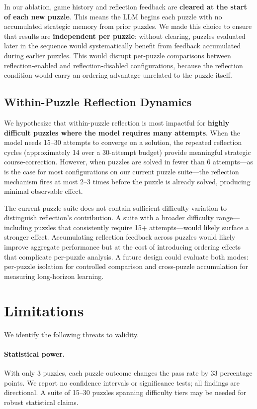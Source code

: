 \documentclass[11pt]{article}
\begin{document}
In our ablation, game history and reflection feedback are \textbf{cleared at the start of each new puzzle}.
This means the LLM begins each puzzle with no accumulated strategic memory from prior puzzles.
We made this choice to ensure that results are \textbf{independent per puzzle}: without clearing, puzzles evaluated later in the sequence would systematically benefit from feedback accumulated during earlier puzzles.
This would disrupt per-puzzle comparisons between reflection-enabled and reflection-disabled configurations, because the reflection condition would carry an ordering advantage unrelated to the puzzle itself.

\subsection{Within-Puzzle Reflection Dynamics}

We hypothesize that within-puzzle reflection is most impactful for \textbf{highly difficult puzzles where the model requires many attempts}.
When the model needs 15--30 attempts to converge on a solution, the repeated reflection cycles (approximately 14 over a 30-attempt budget) provide meaningful strategic course-correction.
However, when puzzles are solved in fewer than 6 attempts---as is the case for most configurations on our current puzzle suite---the reflection mechanism fires at most 2--3 times before the puzzle is already solved, producing minimal observable effect.

The current puzzle suite does not contain sufficient difficulty variation to distinguish reflection's contribution.
A suite with a broader difficulty range---including puzzles that consistently require 15+ attempts---would likely surface a stronger effect.
Accumulating reflection feedback across puzzles would likely improve aggregate performance but at the cost of introducing ordering effects that complicate per-puzzle analysis.
A future design could evaluate both modes: per-puzzle isolation for controlled comparison and cross-puzzle accumulation for measuring long-horizon learning.

\section{Limitations}\label{sec:limitations}

We identify the following threats to validity.

\paragraph{Statistical power.}
With only 3 puzzles, each puzzle outcome changes the pass rate by 33 percentage points.
We report no confidence intervals or significance tests; all findings are directional.
A suite of 15--30 puzzles spanning difficulty tiers may be needed for robust statistical claims.
\end{document}
